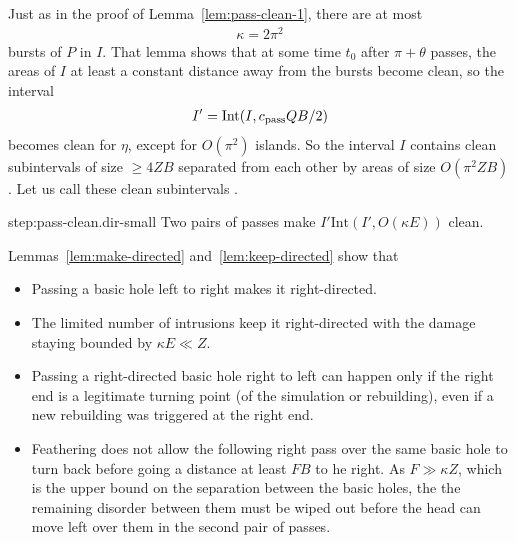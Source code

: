 \documentclass[11pt]{memoir}
\theoremstyle{definition} %
\renewcommand{\ge}{\geq}
\def\B{B}
\newcommand{\E}{E}
\newcommand{\F}{F}
\newcommand{\Int}{\mathrm{Int}}
\newcommand{\passno}{\pi}
\newcommand{\Q}{Q}
\newcommand{\Z}{Z}
\newcommand{\cns}[1]{c_{\textrm{\upshape #1}}}
\newcommand{\CPass}{\cns{pass}}
\begin{document}
\begin{Proof}
    Just as in the proof of Lemma~\ref{lem:pass-clean-1}, there are at most
     \begin{align}\label{eq:islands-bd}
 \kappa = 2\passno^{2}
     \end{align}
bursts of \( P \) in \( I \).
That  lemma shows that at some time \( t_{0} \)
after \( \passno+\theta \) passes, the areas of \( I \)
at least a constant distance away from the bursts become clean, so the  interval 
\begin{align*}
 I'=\Int(I,\CPass\Q\B/2 )  
\end{align*}
becomes clean for \( \eta \), except for \( O(\passno^{2}) \) islands.
So the interval \( I \) contains clean subintervals of size \( \ge 4\Z\B \)
separated from each other by areas of size \( O(\passno^{2}\Z\B) \).
Let us call these clean subintervals .
\begin{step+}{step:pass-clean.dir-small}
Two pairs of passes make \( I' \Int(I',O(\kappa\E)) \) clean.
\end{step+}
\begin{pproof}
 Lemmas~\ref{lem:make-directed} and~\ref{lem:keep-directed} show that
\begin{itemize}
  \item Passing a basic hole left to right makes it right-directed.
  \item  The limited number of intrusions keep it right-directed with the damage staying
 bounded by \( \kappa\E \ll \Z \).
\item Passing a right-directed basic hole right to left can happen only if the
  right end is a legitimate turning point (of the simulation or rebuilding),
  even if a new rebuilding was triggered at the right end.
  \item Feathering does not allow the following right pass over the same basic hole
to turn back before going a distance at least \( \F\B \) to he right.
As \( \F \gg\kappa\Z \), which is 
the upper bound on the separation between the basic holes,
the the remaining disorder between them must be wiped out before the head can move left over them
in the second pair of passes.
\end{itemize}
 \end{pproof}
  

\end{Proof}
\end{document}

